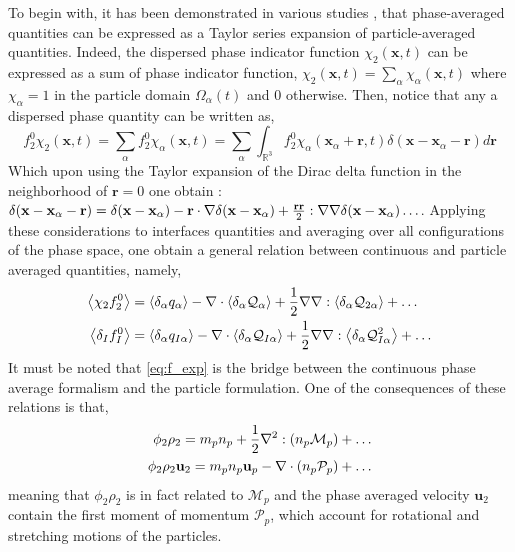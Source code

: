 To begin with, it has been demonstrated in various studies \citep{nott2011suspension,jackson1997locally,zhang1994averaged}, that phase-averaged quantities can be expressed as a Taylor series expansion of particle-averaged quantities. 
Indeed, the dispersed phase indicator function $\chi_2(\textbf{x},t)$ can be expressed as a sum of phase indicator function, $\chi_2(\textbf{x},t) = \sum_\alpha\chi_\alpha(\textbf{x},t)$ where $\chi_\alpha =1$ in the particle domain $\Omega_\alpha(t)$ and $0$ otherwise. 
Then, notice that any a dispersed phase quantity can be written as, 
\begin{equation*}
    f^0_2 \chi_2(\textbf{x},t)
    = \sum_\alpha f^0_2 \chi_\alpha(\textbf{x},t) 
    = \sum_\alpha \int_{\mathbb{R}^3} f^0_2 \chi_\alpha(\textbf{x}_\alpha+\textbf{r},t)\delta(\textbf{x}- \textbf{x}_\alpha - \textbf{r}) d\textbf{r} 
\end{equation*}
Which upon using the Taylor expansion of the Dirac delta function in the neighborhood of $\textbf{r}=0$ one obtain :  $\delta(\textbf{x}- \textbf{x}_\alpha - \textbf{r}) = \delta(\textbf{x}- \textbf{x}_\alpha) - \textbf{r}\cdot\mathbf{\nabla} \delta(\textbf{x} - \textbf{x}_\alpha) + \frac{\textbf{rr}}{2}:\mathbf{\nabla}\mathbf{\nabla}\delta(\textbf{x}- \textbf{x}_\alpha)\ldots $.
Applying these considerations to interfaces quantities and averaging over all configurations of the phase space, one obtain a general relation between continuous and particle averaged quantities, namely, 
\begin{align}
    \left<\chi_2f_2^0\right> 
    &=  \left<\delta_\alpha q_\alpha\right>
        - \mathbf{\nabla}\cdot  
        \left<\delta_\alpha \mathcal{Q}_\alpha\right>        
        + \frac{1}{2} \mathbf{\nabla}\mathbf{\nabla} : \left<\delta_\alpha \mathcal{Q}_{2\alpha}\right>
        + \ldots  
        \nonumber\\
    \left<\delta_I f_I^0\right> 
    &=  \left<\delta_\alpha q_{I\alpha}\right>        
        - \mathbf{\nabla}\cdot \left<\delta_\alpha \mathcal{Q}_{I\alpha}\right>
        + \frac{1}{2} \mathbf{\nabla}\mathbf{\nabla} : \left<\delta_\alpha \mathcal{Q}_{I\alpha}^{2}\right>
        + \ldots  
    \label{eq:f_exp}
\end{align}
It must be noted that \ref{eq:f_exp} is the bridge between the continuous phase average formalism and the particle formulation. 
One of the consequences of these relations is that, 
\begin{align}
    \phi_2 \rho_2
    = m_p n_p 
    + \frac{1}{2}\mathbf{\nabla}^2 : (n_p\mathcal{M}_p)+\ldots\\
    \phi_2 \rho_2 \textbf{u}_2
    = m_p n_p \textbf{u}_p 
    - \mathbf{\nabla}\cdot (n_p\mathcal{P}_p)+\ldots
    \label{eq:f_exp_exe}
\end{align}
meaning that $\phi_2\rho_2$ is in fact related to $\mathcal{M}_p$ and the phase averaged velocity $\textbf{u}_2$ contain the first  moment of momentum $\mathcal{P}_p$, which account for rotational and stretching motions of the particles. 


